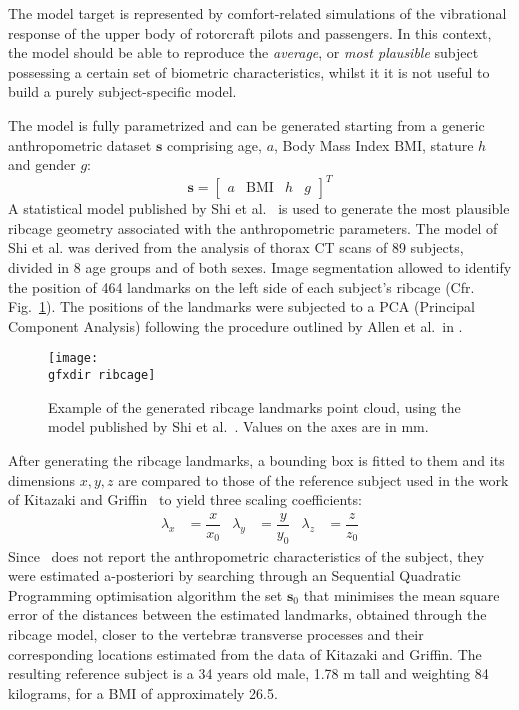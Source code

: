 The model target is represented by comfort-related simulations of the
vibrational response of the upper body of rotorcraft pilots and passengers. In
this context, the model should be able to reproduce the \emph{average}, or
\emph{most plausible} subject possessing a certain set of biometric
characteristics, whilst it it is not useful to build a purely subject-specific
model.   

The model is fully parametrized and can be generated starting from a generic
anthropometric dataset $\mathbf{s}$ comprising age, $a$, Body Mass Index
$\mathrm{BMI}$, stature $h$ and gender $g$:
\begin{equation}
	\mathbf{s} = \begin{bmatrix} a &\mathrm{BMI} &h &g \end{bmatrix}^{T}
	\label{eq:anthro_vect}
\end{equation}
A statistical model published by Shi et al.~\cite{SHI-2014-JB} is used to
generate the most plausible ribcage geometry associated with the anthropometric
parameters. The model of Shi et al. was derived from the analysis of thorax CT
scans of 89 subjects, divided in 8 age groups and of both sexes. Image
segmentation allowed to identify the position of 464 landmarks on the left side
of each subject's ribcage (Cfr. Fig.~\ref{fig:ribcage-3d}). The positions of the
landmarks were subjected to a PCA (Principal Component Analysis) following the
procedure outlined by Allen et al.\ in \cite{ALLEN-2003-ACMTC}. 

\begin{figure}[htbp]
	\centering
	\texttt{[image: \\gfxdir ribcage]}
	\caption{Example of the generated ribcage landmarks point cloud, using
	the model published by Shi et al.~\cite{SHI-2014-JB}. Values on the axes
	are in mm.}
	\label{fig:ribcage-3d}
\end{figure}

After generating the ribcage landmarks, a bounding box is fitted to them and its
dimensions $x, y, z$ are compared to those of the reference subject used in the
work of Kitazaki and Griffin~\cite{KITAZAKI1997} to yield three scaling
coefficients:
\begin{subequations}
	\begin{align}
		\lambda_x &= \dfrac{x}{x_0} &\lambda_y &= \dfrac{y}{y_0}
		&\lambda_z &= \dfrac{z}{z_0}
	\end{align}
	\label{eq:scalingf}
\end{subequations}
Since~\cite{KITAZAKI1997} does not report the anthropometric characteristics of
the subject, they were estimated a-posteriori by searching through an Sequential
Quadratic Programming optimisation algorithm the set $\mathbf{s}_0$ that
minimises the mean square error of the distances between the estimated
landmarks, obtained through the ribcage model, closer to the vertebr\ae
transverse processes and their corresponding locations estimated from the data
of Kitazaki and Griffin. The resulting reference subject is a 34 years old male,
1.78 m tall and weighting 84 kilograms, for a BMI of approximately 26.5.

